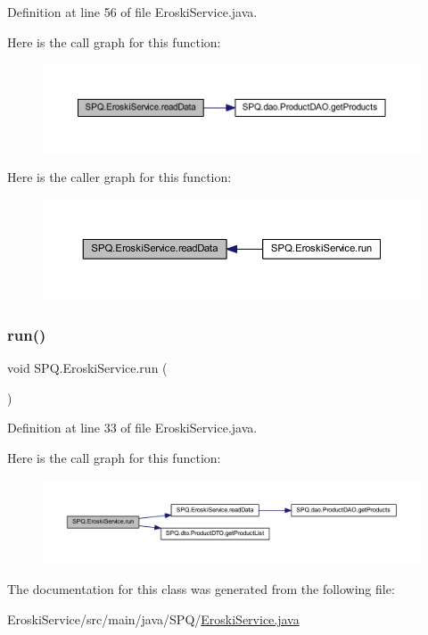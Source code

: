 Definition at line 56 of file Eroski\+Service.\+java.

Here is the call graph for this function\+:\nopagebreak
\begin{figure}[H]
\begin{center}
\leavevmode
\includegraphics[width=350pt]{class_s_p_q_1_1_eroski_service_a89fa3f97cdca647e3c6d6606e5dc2443_cgraph}
\end{center}
\end{figure}
Here is the caller graph for this function\+:\nopagebreak
\begin{figure}[H]
\begin{center}
\leavevmode
\includegraphics[width=350pt]{class_s_p_q_1_1_eroski_service_a89fa3f97cdca647e3c6d6606e5dc2443_icgraph}
\end{center}
\end{figure}
\mbox{\label{class_s_p_q_1_1_eroski_service_abacda123f2febc1eb7c2825eb4e46c37}} 
\subsubsection{\texorpdfstring{run()}{run()}}
{\footnotesize\ttfamily void S\+P\+Q.\+Eroski\+Service.\+run (\begin{DoxyParamCaption}{ }\end{DoxyParamCaption})}



Definition at line 33 of file Eroski\+Service.\+java.

Here is the call graph for this function\+:\nopagebreak
\begin{figure}[H]
\begin{center}
\leavevmode
\includegraphics[width=350pt]{class_s_p_q_1_1_eroski_service_abacda123f2febc1eb7c2825eb4e46c37_cgraph}
\end{center}
\end{figure}


The documentation for this class was generated from the following file\+:\begin{DoxyCompactItemize}
\item 
Eroski\+Service/src/main/java/\+S\+P\+Q/\mbox{\hyperlink{_eroski_service_8java}{Eroski\+Service.\+java}}\end{DoxyCompactItemize}
